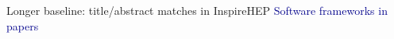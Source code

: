 \documentclass[aspectratio=169]{beamer}
\begin{document}
\begin{frame}{Longer baseline: title/abstract matches in InspireHEP}
\vspace{0.35 cm}
\textcolor{darkblue}{Software frameworks in  papers}

\begin{columns}
\end{columns}
\end{frame}
\end{document}
